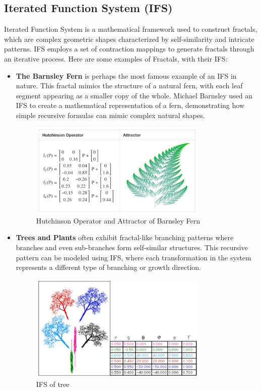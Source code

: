 \documentclass[a4paper,11pt, titlepage]{article}
\theoremstyle{definition}
\theoremstyle{plain}
\theoremstyle{remark}
\theoremstyle{definition}
\begin{document}
\subsection{Iterated Function System (IFS)}
Iterated Function System is a mathematical framework used to construct fractals, which are complex geometric shapes characterized by self-similarity and intricate patterns. IFS employs a set of contraction mappings to generate fractals through an iterative process.
Here are some examples of Fractals, with their IFS:
\begin{itemize}
    \item \textbf{The Barnsley Fern} is perhaps the most famous example of an IFS in nature. This fractal mimics the structure of a natural fern, with each leaf segment appearing as a smaller copy of the whole. Michael Barnsley used an IFS to create a mathematical representation of a fern, demonstrating how simple recursive formulas can mimic complex natural shapes.
    \begin{figure}[h]
    \centering
    \includegraphics[width=0.8\textwidth]{pic1.jpg}
    \caption{Hutchinson Operator and Attractor of Barnsley Fern\cite{algorithmarchive2024IFS}}
    \label{fig:BarnsleyFern}
    \end{figure}

    \item \textbf{Trees and Plants} often exhibit fractal-like branching patterns where branches and even sub-branches form self-similar structures. This recursive pattern can be modeled using IFS, where each transformation in the system represents a different type of branching or growth direction.
    \begin{figure}[h]
    \centering
    \includegraphics[width=0.8\textwidth]{pic2.jpg}
    \caption{IFS of tree\cite{treeIFS}}
    \label{fig:BarnsleyFern}
    \end{figure}
\end{itemize}
\end{document}
